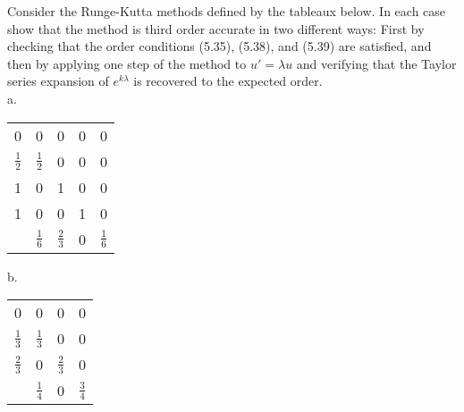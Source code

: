 Consider the Runge-Kutta methods defined by the tableaux below. In each case show that the method
is third order accurate in two different ways: First by checking that the order conditions (5.35), 
(5.38), and (5.39) are satisfied, and then by applying one step of the method to $u' = \lambda u$ and
verifying that the Taylor series expansion of $e^{k\lambda}$ is recovered to the expected order.\\
a. \begin{center}
\begin{tabular}{c | c c c c}
0 & 0 & 0 & 0 & 0 \\
$\frac12$ & $\frac12$ & 0 & 0 & 0 \\
1 & 0 & 1 & 0 & 0 \\
1 & 0 & 0 & 1 & 0 \\
\hline
 & $\frac16$ & $\frac23$ & 0 & $\frac16$
\end{tabular}
\end{center}

b. \begin{center}
\begin{tabular}{c | c c c}
0 & 0 & 0 & 0 \\
$\frac13$ & $\frac13$ & 0 & 0 \\
$\frac23$ & 0 & $\frac23$ & 0 \\
\hline
 & $\frac14$ & 0 & $\frac34$
\end{tabular}
\end{center}

